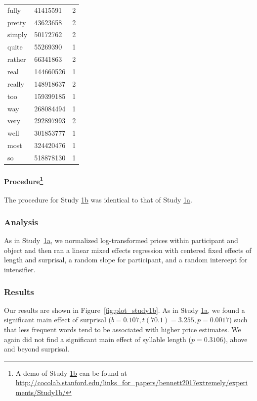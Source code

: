 \documentclass[10pt,letterpaper]{article}
\begin{document}
\begin{table}[ht]
\begin{center}
\begin{tabular}{llc}
    fully & 41415591 & 2 \\ 
    pretty & 43623658 & 2 \\ 
    simply & 50172762 & 2 \\ 
    quite & 55269390 & 1 \\ 
    rather & 66341863 & 2 \\ 
    real & 144660526 & 1 \\ 
    really & 148918637 & 2 \\ 
    too & 159399185 & 1 \\ 
    way & 268084494 & 1 \\ 
    very & 292897993 & 2 \\ 
    well & 301853777 & 1 \\ 
    most & 324420476 & 1 \\ 
    so & 518878130 & 1
  \end{tabular}
 \end{center}
\end{table}

\paragraph{Procedure\footnote{A demo of Study \hyperref[sec:study1b]{1b} can be found at \url{http://cocolab.stanford.edu/links_for_papers/bennett2017extremely/experiments/Study1b/}}}

The procedure for Study \hyperref[sec:study1b]{1b} was identical to that of Study \hyperref[sec:study1a]{1a}.


\subsubsection{Analysis}

As in Study~\hyperref[sec:study1a]{1a}, we normalized log-transformed prices within participant and object and then ran a linear mixed effects regression with centered fixed effects of length and surprisal, a random slope for participant, and a random intercept for intensifier.

\subsubsection{Results}

Our results are shown in Figure~\ref{fig:plot_study1b}. 
As in Study \hyperref[sec:study1a]{1a}, we found a significant main effect of surprisal ($b=0.107,t(70.1)=3.255,p=0.0017$) such that less frequent words tend to be associated with higher price estimates.
We again did not find a significant main effect of syllable length ($p=0.3106$), above and beyond surprisal.
\end{document}
